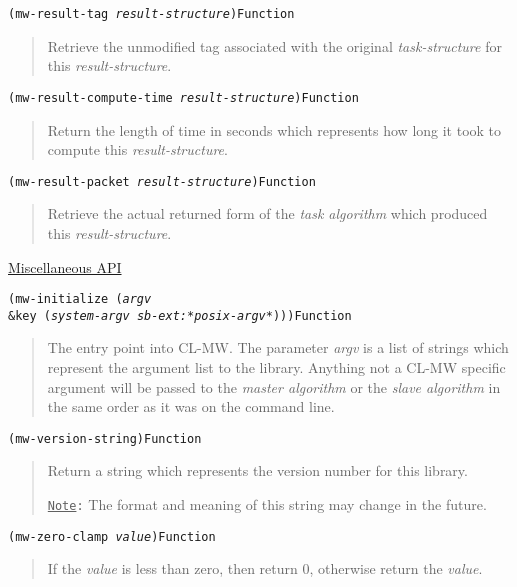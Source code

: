 \documentclass[titlepage,12pt]{book}
\newcommand{\xsmall}{\latexhtml{\small}{}}
\newcommand{\xnormalsize}{\latexhtml{\normalsize}{}}
\newcommand{\clmw}{\xsmall\textsc{CL-MW}\xnormalsize\xspace}
\newcommand{\sa}{\textit{slave algorithm}\xspace}
\newcommand{\ma}{\textit{master algorithm}\xspace}
\newcommand{\ta}{\textit{task algorithm}\xspace}
\newcommand{\Note}{\texttt{\underline{Note}:}\xspace}
\newcommand{\apiheader}[1]{\begin{center}\underline{#1}\end{center}}
\newcommand{\apifunc}[2]{\noindent\xsmall\texttt{(#1)}\hspace*{\fill}\xnormalsize\texttt{#2}}
\newenvironment{apientry}[2]
	{\apifunc{#1}{#2}\begin{quotation}}
	{\end{quotation}}
\begin{document}
\begin{apientry}
{mw-result-tag \emph{result-structure}}
{Function}
Retrieve the unmodified tag associated with the original \emph{task-structure}
for this \emph{result-structure}.
\end{apientry}

\begin{apientry}
{mw-result-compute-time \emph{result-structure}}
{Function}
Return the length of time in seconds which represents how long it took to
compute this \emph{result-structure}.
\end{apientry}

\begin{apientry}
{mw-result-packet \emph{result-structure}}
{Function}
Retrieve the actual returned form of the \ta which produced this 
\emph{result-structure}.
\end{apientry}

\apiheader{Miscellaneous API}
\begin{apientry}
{mw-initialize (\emph{argv}\\
\indent \&key (\emph{system-argv} \emph{sb-ext:*posix-argv*}))}
{Function}
The entry point into \clmw. The parameter \emph{argv} is a list of
strings which represent the argument list to the library. Anything
not a \clmw specific argument will be passed to the \ma or the \sa
in the same order as it was on the command line.
\end{apientry}

\begin{apientry}
{mw-version-string}
{Function}
Return a string which represents the version number for this library.

\Note The format and meaning of this string may change in the future.
\end{apientry}

\begin{apientry}
{mw-zero-clamp \emph{value}}
{Function}
If the \emph{value} is less than zero, then return 0, otherwise return the
\emph{value}.
\end{apientry}
\end{document}
